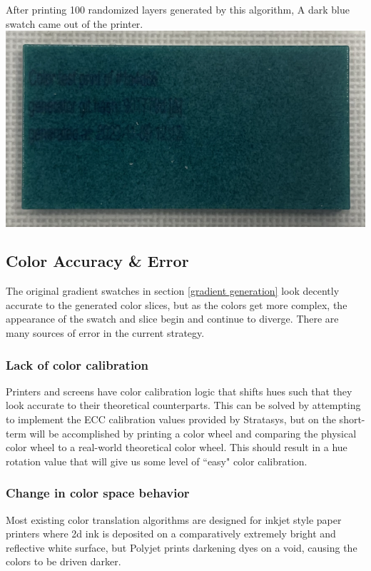 \documentclass{article}
\begin{document}
\begin{multicols}{2}
\noindent
After printing 100 randomized layers generated by this algorithm, A dark blue swatch came out of the printer.
\\

\noindent
\includegraphics[width=\columnwidth]{ffa4d66-result-1}

\subsection{Color Accuracy \& Error}

The original gradient swatches in section \ref{gradient generation} look decently accurate to the generated color slices, but as the colors get more complex, the appearance of the swatch and slice begin and continue to diverge. There are many sources of error in the current strategy.

\subsubsection{Lack of color calibration}

Printers and screens have color calibration logic that shifts hues such that they look accurate to their theoretical counterparts. This can be solved by attempting to implement the ECC calibration values provided by Stratasys, but on the short-term will be accomplished by printing a color wheel and comparing the physical color wheel to a real-world theoretical color wheel. This should result in a hue rotation value that will give us some level of ``easy" color calibration. 

\subsubsection{Change in color space behavior}

Most existing color translation algorithms are designed for inkjet style paper printers where 2d ink is deposited on a comparatively extremely bright and reflective white surface, but Polyjet prints darkening dyes on a void, causing the colors to be driven darker.


\end{multicols}
\end{document}
